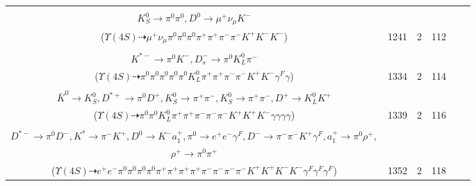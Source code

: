 \documentclass[landscape]{article}
\newcounter{rownumbers}
\newcommand\rn{\stepcounter{rownumbers}\arabic{rownumbers}}
\newcommand{\EOLP}{\\ \hline} %
\newcommand{\topoTags}[1]{#1} %
\begin{document}
\begin{longtable}{clcccc}
\rn & \makecell[l]{ $ 
\Upsilon(4S) \rightarrow B^{0} \bar{B}^{0} ,
B^{0} \rightarrow K^{0} K^{+} K^{-} ,
\bar{B}^{0} \rightarrow \pi^{+} \pi^{-} \rho^{-} D^{*+} ,
K^{0} \rightarrow K_{S}^{0} ,
\rho^{-} \rightarrow \pi^{0} \pi^{-} ,
D^{*+} \rightarrow \pi^{+} D^{0} ,
$ \\ $
K_{S}^{0} \rightarrow \pi^{0} \pi^{0} ,
D^{0} \rightarrow \mu^{+} \nu_{\mu} K^{-} 
$ \\ ($
\Upsilon(4S) \dashrightarrow \mu^{+} \nu_{\mu} \pi^{0} \pi^{0} \pi^{0} \pi^{+} \pi^{+} \pi^{-} \pi^{-} K^{+} K^{-} K^{-} 
$) } & \topoTags{1241 & }2 & 112 \EOLP

\rn & \makecell[l]{ $ 
\Upsilon(4S) \rightarrow B^{0} \bar{B}^{0} ,
B^{0} \rightarrow \pi^{0} \pi^{-} K^{+} ,
\bar{B}^{0} \rightarrow \pi^{0} \pi^{+} D^{0} D_{s}^{*-} ,
D^{0} \rightarrow \rho^{+} K^{*-} ,
D_{s}^{*-} \rightarrow D_{s}^{-} \gamma ,
\rho^{+} \rightarrow \pi^{0} \pi^{+} \gamma^{F} ,
$ \\ $
K^{*-} \rightarrow \pi^{0} K^{-} ,
D_{s}^{-} \rightarrow \pi^{0} K_{L}^{0} \pi^{-} 
$ \\ ($
\Upsilon(4S) \dashrightarrow \pi^{0} \pi^{0} \pi^{0} \pi^{0} \pi^{0} K_{L}^{0} \pi^{+} \pi^{+} \pi^{-} \pi^{-} K^{+} K^{-} \gamma^{F} \gamma 
$) } & \topoTags{1334 & }2 & 114 \EOLP

\rn & \makecell[l]{ $ 
\Upsilon(4S) \rightarrow B^{0} \bar{B}^{0} ,
B^{0} \rightarrow \pi^{0} K^{+} K^{-} ,
\bar{B}^{0} \rightarrow \pi^{-} \eta \eta K^{0} \bar{K}^{0} D^{*+} ,
\eta \rightarrow \gamma \gamma ,
\eta \rightarrow \gamma \gamma ,
K^{0} \rightarrow K_{S}^{0} ,
$ \\ $
\bar{K}^{0} \rightarrow K_{S}^{0} ,
D^{*+} \rightarrow \pi^{0} D^{+} ,
K_{S}^{0} \rightarrow \pi^{+} \pi^{-} ,
K_{S}^{0} \rightarrow \pi^{+} \pi^{-} ,
D^{+} \rightarrow K_{L}^{0} K^{+} 
$ \\ ($
\Upsilon(4S) \dashrightarrow \pi^{0} \pi^{0} K_{L}^{0} \pi^{+} \pi^{+} \pi^{-} \pi^{-} \pi^{-} K^{+} K^{+} K^{-} \gamma \gamma \gamma \gamma 
$) } & \topoTags{1339 & }2 & 116 \EOLP

\rn & \makecell[l]{ $ 
\Upsilon(4S) \rightarrow B^{0} \bar{B}^{0} ,
B^{0} \rightarrow \pi^{0} \bar{D}^{0} ,
\bar{B}^{0} \rightarrow \bar{K}^{*} D^{*+} D^{*-} ,
\bar{D}^{0} \rightarrow \pi^{0} \pi^{+} \pi^{-} K^{*} ,
\bar{K}^{*} \rightarrow \pi^{+} K^{-} \gamma^{F} ,
D^{*+} \rightarrow \pi^{+} D^{0} ,
$ \\ $
D^{*-} \rightarrow \pi^{0} D^{-} ,
K^{*} \rightarrow \pi^{-} K^{+} ,
D^{0} \rightarrow K^{-} a_{1}^{+} ,
\pi^{0} \rightarrow e^{+} e^{-} \gamma^{F} ,
D^{-} \rightarrow \pi^{-} \pi^{-} K^{+} \gamma^{F} ,
a_{1}^{+} \rightarrow \pi^{0} \rho^{+} ,
$ \\ $
\rho^{+} \rightarrow \pi^{0} \pi^{+} 
$ \\ ($
\Upsilon(4S) \dashrightarrow e^{+} e^{-} \pi^{0} \pi^{0} \pi^{0} \pi^{0} \pi^{+} \pi^{+} \pi^{+} \pi^{+} \pi^{-} \pi^{-} \pi^{-} \pi^{-} K^{+} K^{+} K^{-} K^{-} \gamma^{F} \gamma^{F} \gamma^{F} 
$) } & \topoTags{1352 & }2 & 118 \EOLP


\end{longtable}
\end{document}
